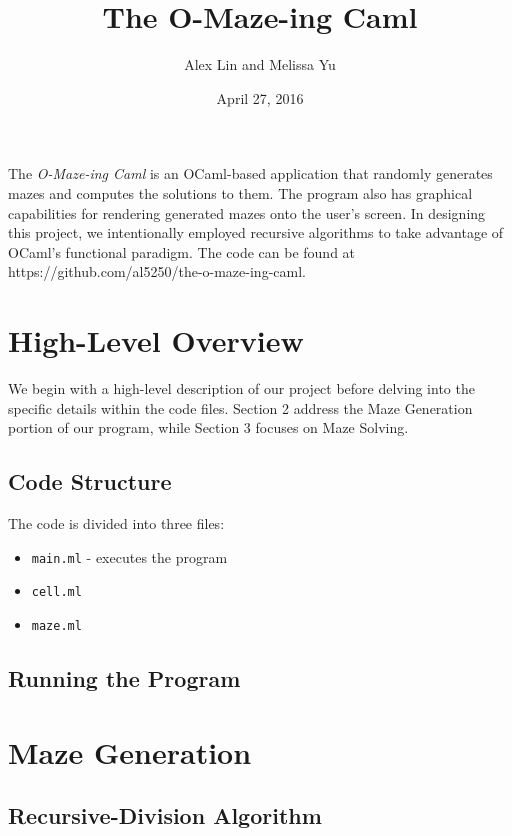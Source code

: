 \documentclass[11pt, margin=1in]{article}
\begin{document}
\title{The O-Maze-ing Caml}
\author{Alex Lin and Melissa Yu}
\date{April 27, 2016}
\maketitle

 
The \textit{O-Maze-ing Caml} is an OCaml-based application that randomly generates mazes and computes the solutions to them.  The program also has graphical capabilities for rendering generated mazes onto the user's screen.  In designing this project, we intentionally employed recursive algorithms to take advantage of OCaml's functional paradigm.  The code can be found at https://github.com/al5250/the-o-maze-ing-caml.  

\section{High-Level Overview}

We begin with a high-level description of our project before delving into the specific details within the code files.  Section 2 address the Maze Generation portion of our program, while Section 3 focuses on Maze Solving.  

\subsection{Code Structure}  %
The code is divided into three files:
\begin{itemize}
\item \texttt{main.ml} - executes the program 
\item \texttt{cell.ml}
\item \texttt{maze.ml}
\end{itemize} 

\subsection{Running the Program} %

\section{Maze Generation}

\subsection{Recursive-Division Algorithm}  %
\end{document}
